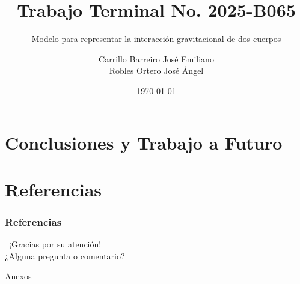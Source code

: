 \documentclass[spanish]{beamer}
\author[Carrillo B. José E. \&  Robles O. José A.]{Carrillo Barreiro José Emiliano \\ Robles Ortero José Ángel}
\title{Trabajo Terminal No. 2025-B065}
\subtitle{Modelo para representar la interacción gravitacional de dos cuerpos}
\institute{Instituto Politécnico Nacional \\ Escuela Superior de Cómputo}
\date{\today}
\begin{document}
    \begin{frame}
        \titlepage%
    \end{frame}

    
    
    
    
    
    

    \section[Conclusiones]{Conclusiones y Trabajo a Futuro}


    \section{Referencias}

    \begin{frame}[allowframebreaks]
        \frametitle{Referencias}
        \begingroup
        \fontsize{6pt}{7pt}\selectfont
        \printbibliography[heading=none]
        \endgroup
    \end{frame}

    \begin{frame}
        \begin{center}
            {\Huge\calligra~¡Gracias por su atención!}\\
            ¿Alguna pregunta o comentario?
        \end{center}
    \end{frame}

    \appendix
    \makeatletter
    \renewcommand{\thesection}{\Alph{section}}
    \makeatother
    \setcounter{section}{0}

    \begin{frame}
        \begingroup
            \begin{center}
                {\Huge Anexos}
            \end{center}
        \endgroup
    \end{frame}
    
\end{document}
